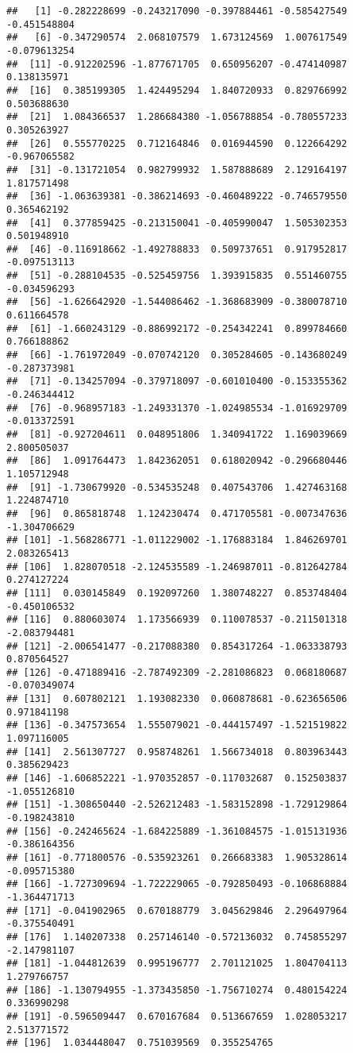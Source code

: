 \documentclass[
]{article}
\begin{document}
\begin{verbatim}
##   [1] -0.282228699 -0.243217090 -0.397884461 -0.585427549 -0.451548804
##   [6] -0.347290574  2.068107579  1.673124569  1.007617549 -0.079613254
##  [11] -0.912202596 -1.877671705  0.650956207 -0.474140987  0.138135971
##  [16]  0.385199305  1.424495294  1.840720933  0.829766992  0.503688630
##  [21]  1.084366537  1.286684380 -1.056788854 -0.780557233  0.305263927
##  [26]  0.555770225  0.712164846  0.016944590  0.122664292 -0.967065582
##  [31] -0.131721054  0.982799932  1.587888689  2.129164197  1.817571498
##  [36] -1.063639381 -0.386214693 -0.460489222 -0.746579550  0.365462192
##  [41]  0.377859425 -0.213150041 -0.405990047  1.505302353  0.501948910
##  [46] -0.116918662 -1.492788833  0.509737651  0.917952817 -0.097513113
##  [51] -0.288104535 -0.525459756  1.393915835  0.551460755 -0.034596293
##  [56] -1.626642920 -1.544086462 -1.368683909 -0.380078710  0.611664578
##  [61] -1.660243129 -0.886992172 -0.254342241  0.899784660  0.766188862
##  [66] -1.761972049 -0.070742120  0.305284605 -0.143680249 -0.287373981
##  [71] -0.134257094 -0.379718097 -0.601010400 -0.153355362 -0.246344412
##  [76] -0.968957183 -1.249331370 -1.024985534 -1.016929709 -0.013372591
##  [81] -0.927204611  0.048951806  1.340941722  1.169039669  2.800505037
##  [86]  1.091764473  1.842362051  0.618020942 -0.296680446  1.105712948
##  [91] -1.730679920 -0.534535248  0.407543706  1.427463168  1.224874710
##  [96]  0.865818748  1.124230474  0.471705581 -0.007347636 -1.304706629
## [101] -1.568286771 -1.011229002 -1.176883184  1.846269701  2.083265413
## [106]  1.828070518 -2.124535589 -1.246987011 -0.812642784  0.274127224
## [111]  0.030145849  0.192097260  1.380748227  0.853748404 -0.450106532
## [116]  0.880603074  1.173566939  0.110078537 -0.211501318 -2.083794481
## [121] -2.006541477 -0.217088380  0.854317264 -1.063338793  0.870564527
## [126] -0.471889416 -2.787492309 -2.281086823  0.068180687 -0.070349074
## [131]  0.607802121  1.193082330  0.060878681 -0.623656506  0.971841198
## [136] -0.347573654  1.555079021 -0.444157497 -1.521519822  1.097116005
## [141]  2.561307727  0.958748261  1.566734018  0.803963443  0.385629423
## [146] -1.606852221 -1.970352857 -0.117032687  0.152503837 -1.055126810
## [151] -1.308650440 -2.526212483 -1.583152898 -1.729129864 -0.198243810
## [156] -0.242465624 -1.684225889 -1.361084575 -1.015131936 -0.386164356
## [161] -0.771800576 -0.535923261  0.266683383  1.905328614 -0.095715380
## [166] -1.727309694 -1.722229065 -0.792850493 -0.106868884 -1.364471713
## [171] -0.041902965  0.670188779  3.045629846  2.296497964 -0.375540491
## [176]  1.140207338  0.257146140 -0.572136032  0.745855297 -2.147981107
## [181] -1.044812639  0.995196777  2.701121025  1.804704113  1.279766757
## [186] -1.130794955 -1.373435850 -1.756710274  0.480154224  0.336990298
## [191] -0.596509447  0.670167684  0.513667659  1.028053217  2.513771572
## [196]  1.034448047  0.751039569  0.355254765
\end{verbatim}
\end{document}
